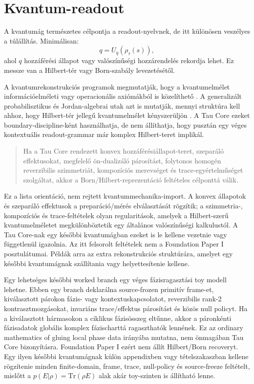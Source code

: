 \documentclass[12pt]{article}
\newcommand{\Rmap}{\rho_{\tau}}
\begin{document}
\section{Kvantum-readout}

A kvantumág természetes célpontja a readout-nyelvnek, de itt különösen veszélyes
a túlállítás.  Minimálisan:
\begin{equation}
  q=U_q(\Rmap(s)),
\end{equation}
ahol \(q\) hozzáférési állapot vagy valószínűségi hozzárendelés rekordja lehet.
Ez messze van a Hilbert-tér vagy Born-szabály levezetésétől.

A kvantumrekonstrukciós programok megmutatják, hogy a kvantumelmélet
információelméleti vagy operacionális axiómákból is közelíthető
\cite{Hardy2001,Chiribella2011,MasanesMueller2011}.  A generalizált
probabilisztikus és Jordan-algebrai utak azt is mutatják, mennyi struktúra kell
ahhoz, hogy Hilbert-tér jellegű kvantumelmélet kényszerüljön
\cite{BarnumWilce2014}.  A Tau Core ezeket boundary-discipline-ként használhatja,
de nem állíthatja, hogy pusztán egy véges kontextuális readout-grammar már
komplex Hilbert-teret implikál.

\begin{quote}
Ha a Tau Core rendezett konvex hozzáférésiállapot-teret, szeparáló effektusokat,
megfelelő ön-dualizáló párosítást, folytonos homogén reverzibilis szimmetriát,
kompozíciós merevséget és trace-egyértelműséget szolgáltat, akkor a
Born/Hilbert-reprezentáció feltételes célponttá válik.
\end{quote}
Ez a lista orientáció, nem rejtett kvantummechanika-import.  A konvex állapotok
és szeparáló effektusok a preparáció/mérés elválasztását rögzítik; a
szimmetria-, kompozíciós és trace-feltételek olyan regularitások, amelyek a
Hilbert-szerű kvantumelméletet megkülönböztetik egy általános valószínűségi
kalkulustól.  A Tau Core-nak egy későbbi kvantumágban ezeket is le kellene
vezetnie vagy függetlenül igazolnia.
Az itt felsorolt feltételek nem a Foundation Paper I posztulátumai.  Példák
arra az extra rekonstrukciós struktúrára, amelyet egy későbbi kvantumágnak
szállítania vagy helyettesítenie kellene.

Egy lehetséges későbbi worked branch egy véges fázisragasztási toy modell
lehetne.  Ebben egy branch deklarálna source-frozen primitív frame-et,
kiválasztott párokon fázis- vagy kontextuskapcsolatot, reverzibilis rank-2
kontrasztmozgásokat, invariáns trace/effektus párosítást és közös null
policyt.  Ha a kiválasztott hármasokon a ciklikus fázisösszeg eltűnne, akkor
a páronkénti fázisadatok globális komplex fázischarttá ragaszthatók lennének.
Ez az ordinary mathematics of gluing local phase data irányába mutatna, nem
önmagában Tau Core bizonyításra.  Foundation Paper I ezért nem állít
Hilbert/Born recoveryt.  Egy ilyen későbbi kvantumágnak külön appendixben vagy
tételszakaszban kellene rögzítenie minden finite-domain, frame, trace,
null-policy és source-freeze feltételt, mielőtt a
\(p(E|\rho)=\mathrm{Tr}(\rho E)\) alak akár toy-szinten is állítható lenne.
\end{document}
